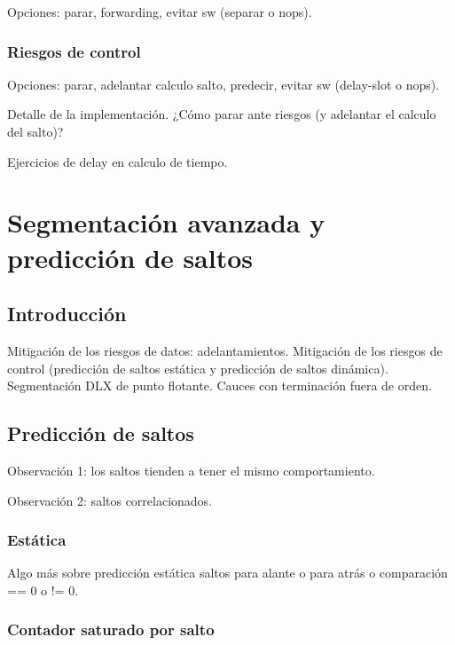 \documentclass[12pt,onecolumn]{memoir}
\begin{document}
Opciones: parar, forwarding, evitar sw (separar o nops).

\subsection{Riesgos de control}

Opciones: parar, adelantar calculo salto, predecir, evitar sw (delay-slot o nops).

Detalle de la implementación. ¿Cómo parar ante riesgos (y adelantar el
calculo del salto)?

Ejercicios de delay en calculo de tiempo.


\chapter{Segmentación avanzada y predicción de saltos}
\label{cap:avanzada}


\section{Introducción}
\label{sec:introduccion_avanzada}

Mitigación de los riesgos de datos: adelantamientos. Mitigación de los riesgos de control (predicción de saltos estática y predicción de saltos dinámica). Segmentación DLX de punto flotante. Cauces con terminación fuera de orden.

\section{Predicción de saltos}

Observación 1: los saltos tienden a tener el mismo comportamiento.

Observación 2: saltos correlacionados.

\subsection{Estática}

Algo más sobre predicción estática saltos para alante o para atrás o comparación == 0 o != 0.

\subsection{Contador saturado por salto}
\end{document}
